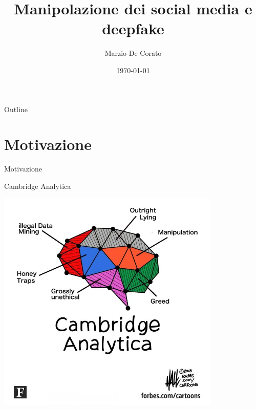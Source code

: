 \documentclass[11pt]{beamer}
\title[Manipolazione e Deepfake]{Manipolazione dei social media e deepfake}}
\author{Marzio De Corato}
\date{\today}
\begin{document}
\begin{frame}
\vspace{+6.8 cm}  \titlepage
\end{frame}

\usebackgroundtemplate{ } 

\begin{frame}{Outline}
\setcounter{tocdepth}{1}
\begin{center}
\Large
  \tableofcontents
\end{center}
\end{frame}

\section{Motivazione}

\begin{frame}
\begin{center}
\Huge
Motivazione
\end{center}
\end{frame}

\begin{frame}{Cambridge Analytica \cite{CA_pic}}

\begin{center}
\includegraphics[width=0.8\textwidth]{Pic/CA_pic.png}
\end{center}

\end{frame}
\end{document}
